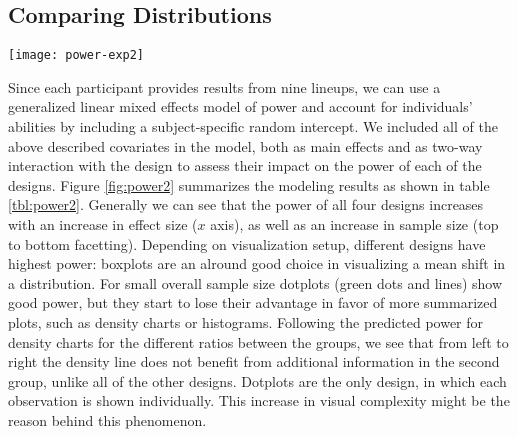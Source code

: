 
\subsection{Comparing Distributions}
\begin{figure*}[htbp] %
   \centering
   \texttt{[image: power-exp2]} 
   \caption{Overview of power predictions for the four different designs. The fully saturated thick lines show average predicted power for each of the designs facetted by size of the red group (top to bottom) and relative size of the blue group to the red group (left to right). }
   \label{fig:power2}
\end{figure*}

Since each participant provides results from nine lineups, we can use a generalized linear mixed effects model of power and account for individuals' abilities by including a subject-specific random intercept. We included all of the above described covariates  in the model, both as main effects and as two-way interaction with the design to assess their impact on the power of each of the designs.
Figure \ref{fig:power2} summarizes the modeling results as shown in table \ref{tbl:power2}. Generally we can see that the power of all four designs increases with an increase in effect size ($x$ axis), as well as an increase in sample size (top to bottom facetting). Depending on visualization setup, different designs have highest power: boxplots  are an alround good choice in visualizing a mean shift in a distribution. For small overall sample size dotplots (green dots and lines) show good power, but they  start to lose their advantage in favor of more summarized plots, such as density charts or histograms. Following the predicted power for density charts for the different ratios between the groups, we see that from left to right the density line does not benefit from additional information in the second group, unlike all of the other designs. Dotplots are the only design, in which each observation is shown individually. This increase in visual complexity might be the reason behind this phenomenon.


